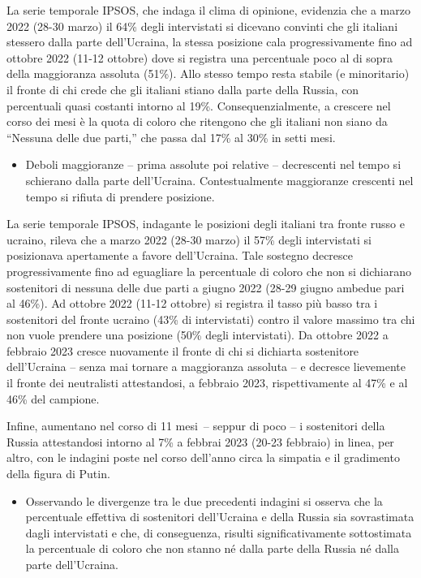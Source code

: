 \documentclass[
  openany]{book}
\providecommand{\tightlist}{%
  \setlength{\itemsep}{0pt}\setlength{\parskip}{0pt}}
\begin{document}
La serie temporale IPSOS, che indaga il clima di opinione, evidenzia che a marzo 2022 (28-30 marzo) il 64\% degli intervistati si dicevano convinti che gli italiani stessero dalla parte dell'Ucraina, la stessa posizione cala progressivamente fino ad ottobre 2022 (11-12 ottobre) dove si registra una percentuale poco al di sopra della maggioranza assoluta (51\%). Allo stesso tempo resta stabile (e minoritario) il fronte di chi crede che gli italiani stiano dalla parte della Russia, con percentuali quasi costanti intorno al 19\%. Consequenzialmente, a crescere nel corso dei mesi è la quota di coloro che ritengono che gli italiani non siano da ``Nessuna delle due parti,'' che passa dal 17\% al 30\% in setti mesi.

\begin{itemize}
\tightlist
\item
  Deboli maggioranze -- prima assolute poi relative -- decrescenti nel tempo si schierano dalla parte dell'Ucraina. Contestualmente maggioranze crescenti nel tempo si rifiuta di prendere posizione.
\end{itemize}

La serie temporale IPSOS, indagante le posizioni degli italiani tra fronte russo e ucraino, rileva che a marzo 2022 (28-30 marzo) il 57\% degli intervistati si posizionava apertamente a favore dell'Ucraina. Tale sostegno decresce progressivamente fino ad eguagliare la percentuale di coloro che non si dichiarano sostenitori di nessuna delle due parti a giugno 2022 (28-29 giugno ambedue pari al 46\%). Ad ottobre 2022 (11-12 ottobre) si registra il tasso più basso tra i sostenitori del fronte ucraino (43\% di intervistati) contro il valore massimo tra chi non vuole prendere una posizione (50\% degli intervistati). Da ottobre 2022 a febbraio 2023 cresce nuovamente il fronte di chi si dichiarta sostenitore dell'Ucraina -- senza mai tornare a maggioranza assoluta -- e decresce lievemente il fronte dei neutralisti attestandosi, a febbraio 2023, rispettivamente al 47\% e al 46\% del campione.

Infine, aumentano nel corso di 11 mesi~-- seppur di poco -- i sostenitori della Russia attestandosi intorno al 7\% a febbrai 2023 (20-23 febbraio) in linea, per altro, con le indagini poste nel corso dell'anno circa la simpatia e il gradimento della figura di Putin.

\begin{itemize}
\tightlist
\item
  Osservando le divergenze tra le due precedenti indagini si osserva che la percentuale effettiva di sostenitori dell'Ucraina e della Russia sia sovrastimata dagli intervistati e che, di conseguenza, risulti significativamente sottostimata la percentuale di coloro che non stanno né dalla parte della Russia né dalla parte dell'Ucraina.
\end{itemize}
\end{document}
